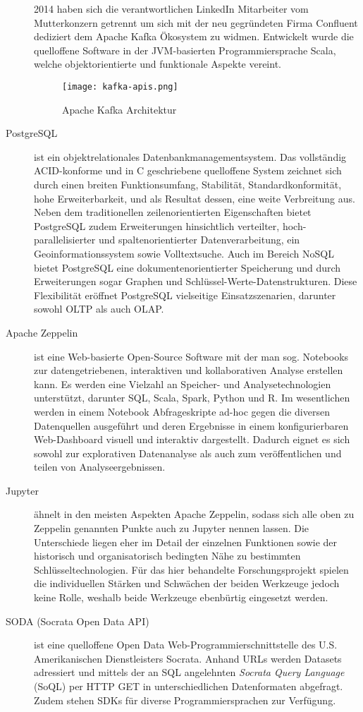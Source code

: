 \begin{description}
	2014 haben sich die verantwortlichen LinkedIn Mitarbeiter vom Mutterkonzern getrennt um sich mit der neu gegründeten Firma Confluent dediziert dem Apache Kafka Ökosystem zu widmen. Entwickelt wurde die quelloffene Software in der JVM-basierten Programmiersprache Scala, welche objektorientierte und funktionale Aspekte vereint.
	\begin{figure}[h]
		\centering
		\texttt{[image: kafka-apis.png]}
		\caption[Apache Kafka Architektur]{Apache Kafka Architektur\citep{TODO}}
		\label{fig:KafkaArchitecture}
	\end{figure}
	\item [PostgreSQL] ist ein objektrelationales Datenbankmanagementsystem. Das vollständig ACID-konforme und in C geschriebene quelloffene System zeichnet sich durch einen breiten Funktionsumfang, Stabilität, Standardkonformität, hohe Erweiterbarkeit, und als Resultat dessen, eine weite Verbreitung aus. Neben dem traditionellen zeilenorientierten  Eigenschaften bietet PostgreSQL zudem Erweiterungen hinsichtlich verteilter, hoch-parallelisierter und  spaltenorientierter Datenverarbeitung, ein Geoinformationssystem sowie Volltextsuche. Auch im Bereich NoSQL bietet PostgreSQL eine dokumentenorientierter Speicherung und durch Erweiterungen sogar Graphen und Schlüssel-Werte-Datenstrukturen. Diese Flexibilität eröffnet PostgreSQL vielseitige Einsatzszenarien, darunter sowohl OLTP als auch OLAP.
	\item [Apache Zeppelin] ist eine Web-basierte Open-Source Software mit der man sog. Notebooks zur datengetriebenen, interaktiven und kollaborativen Analyse erstellen kann. Es werden eine Vielzahl an Speicher- und Analysetechnologien unterstützt, darunter SQL, Scala, Spark, Python und R. Im wesentlichen werden in einem Notebook Abfrageskripte ad-hoc gegen die diversen Datenquellen ausgeführt und deren Ergebnisse in einem konfigurierbaren Web-Dashboard visuell und interaktiv dargestellt. Dadurch eignet es sich sowohl zur explorativen Datenanalyse als auch zum veröffentlichen und teilen von Analyseergebnissen.
	\item [Jupyter] ähnelt in den meisten Aspekten Apache Zeppelin, sodass sich alle oben zu Zeppelin genannten Punkte auch zu Jupyter nennen lassen. Die Unterschiede liegen eher im Detail der einzelnen Funktionen sowie der historisch und organisatorisch bedingten Nähe zu bestimmten Schlüsseltechnologien. Für das hier behandelte Forschungsprojekt spielen die individuellen Stärken und Schwächen der beiden Werkzeuge jedoch keine Rolle, weshalb beide Werkzeuge ebenbürtig eingesetzt werden.
	\item[SODA (Socrata Open Data API)] ist eine quelloffene Open Data Web-Programmierschnittstelle des U.S. Amerikanischen Dienstleisters Socrata. Anhand URLs werden Datasets adressiert und mittels der an SQL angelehnten \textit{Socrata Query Language} (SoQL) per HTTP GET in unterschiedlichen Datenformaten abgefragt. Zudem stehen SDKs für diverse Programmiersprachen zur Verfügung.
\end{description}